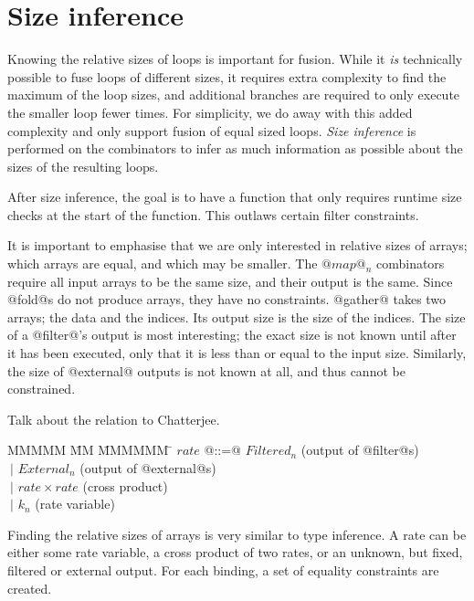\section{Size inference}





Knowing the relative sizes of loops is important for fusion.
While it \emph{is} technically possible to fuse loops of different sizes, it requires extra complexity to find the maximum of the loop sizes, and additional branches are required to only execute the smaller loop fewer times.
For simplicity, we do away with this added complexity and only support fusion of equal sized loops.
\emph{Size inference} is performed on the combinators to infer as much information as possible about the sizes of the resulting loops.

After size inference, the goal is to have a function that only requires runtime size checks at the start of the function. This outlaws certain filter constraints.

It is important to emphasise that we are only interested in relative sizes of arrays; which arrays are equal, and which may be smaller.
The $@map@_n$ combinators require all input arrays to be the same size, and their output is the same.
Since @fold@s do not produce arrays, they have no constraints.
@gather@ takes two arrays; the data and the indices. Its output size is the size of the indices.
The size of a @filter@'s output is most interesting; the exact size is not known until after it has been executed, only that it is less than or equal to the input size.
Similarly, the size of @external@ outputs is not known at all, and thus cannot be constrained.

Talk about the relation to Chatterjee\cite{chatterjee1991size}.

\begin{tabbing}
MMMMM       \= MM \= MMMMMM \= \kill
$rate$      \> @::=@ \> $Filtered_n$        \> (output of @filter@s) \\
            \> $~|$  \> $External_n$        \> (output of @external@s) \\
            \> $~|$  \> $rate \times rate$  \> (cross product) \\
            \> $~|$  \> $k_n$               \> (rate variable)\\
\end{tabbing}

Finding the relative sizes of arrays is very similar to type inference.
A rate can be either some rate variable, a cross product of two rates, or an unknown, but fixed, filtered or external output.
For each binding, a set of equality constraints are created.

